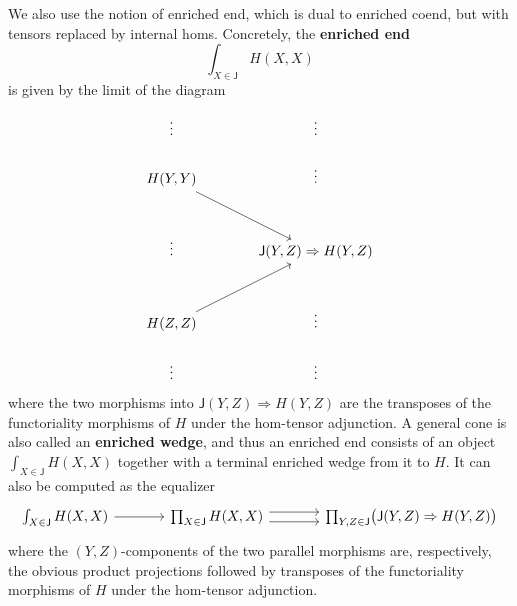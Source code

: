 \documentclass[11pt,onecolumn]{article}
\newcommand{\cJ}{\mathsf{J}}
\theoremstyle{plain}
\theoremstyle{remark}
\theoremstyle{definition}
\begin{document}
We also use the notion of enriched end, which is dual to enriched coend, but with tensors replaced by internal homs.
Concretely, the \textbf{enriched end}
\[
	\int_{X \in \cJ} H(X,X)
\]
is given by the limit of the diagram
\begin{equation}
	\label{wedge_condition}
	\begin{tikzcd}[column sep=large, row sep=large]
		\vdots & \vdots \\[-1.5em]
		H(Y,Y) \ar[dr] & \vdots \\
		\vdots & \cJ(Y,Z) \Rightarrow H(Y,Z) \\
		H(Z,Z) \ar[ur] & \vdots \\[-1.5em]
		\vdots & \vdots
	\end{tikzcd}
\end{equation}
where the two morphisms into $\cJ(Y,Z) \Rightarrow H(Y,Z)$ are the transposes of the functoriality morphisms of $H$ under the hom-tensor adjunction.
A general cone is also called an \textbf{enriched wedge}, and thus an enriched end consists of an object $\int_{X \in \cJ} H(X,X)$ together with a terminal enriched wedge from it to $H$.
It can also be computed as the equalizer
\begin{equation}
	\label{eq:end_equalizer}
	\begin{tikzcd}[column sep=large]
		\int_{X \in \cJ} H(X,X)
		\ar[r]
				&
				\prod_{X \in \cJ} H(X,X)
				\ar[r, shift left=.8ex]
				\ar[r, shift right=.8ex]
				&
				\prod_{Y,Z \in \cJ} \bigl(\cJ(Y,Z) \Rightarrow H(Y,Z)\bigr)
	\end{tikzcd}
\end{equation}
where the $(Y,Z)$-components of the two parallel morphisms are, respectively, the obvious product projections followed by transposes of the functoriality morphisms of $H$ under the hom-tensor adjunction.

\newpage\thispagestyle{empty}
{\linespread{1} }
\end{document}
